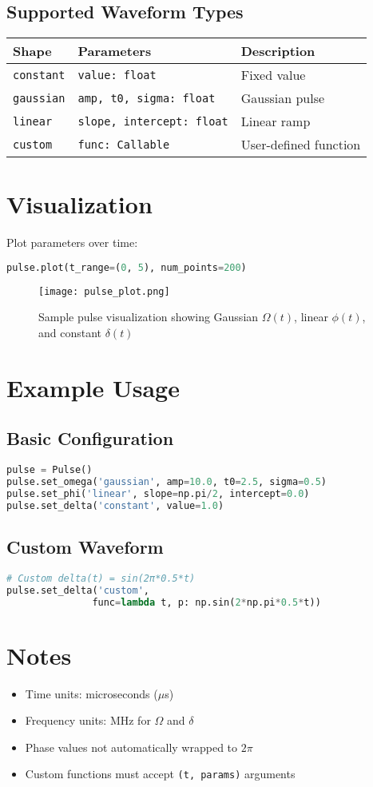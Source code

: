 \documentclass{article}
\begin{document}
\subsection{Supported Waveform Types}
\begin{tabular}{@{}lll@{}}
    \toprule
    \textbf{Shape} & \textbf{Parameters} & \textbf{Description} \\
    \midrule
    \texttt{constant} & \texttt{value: float} & Fixed value \\
    \texttt{gaussian} & \texttt{amp, t0, sigma: float} & Gaussian pulse \\
    \texttt{linear} & \texttt{slope, intercept: float} & Linear ramp \\
    \texttt{custom} & \texttt{func: Callable} & User-defined function \\
    \bottomrule
\end{tabular}

\section{Visualization}
Plot parameters over time:
\begin{lstlisting}[language=Python]
pulse.plot(t_range=(0, 5), num_points=200)
\end{lstlisting}

\begin{figure}[h]
    \centering
    \texttt{[image: pulse\_plot.png]}
    \caption{Sample pulse visualization showing Gaussian \(\Omega(t)\), linear \(\phi(t)\), and constant \(\delta(t)\)}
\end{figure}

\section{Example Usage}
\subsection{Basic Configuration}
\begin{lstlisting}[language=Python]
pulse = Pulse()
pulse.set_omega('gaussian', amp=10.0, t0=2.5, sigma=0.5)
pulse.set_phi('linear', slope=np.pi/2, intercept=0.0)
pulse.set_delta('constant', value=1.0)
\end{lstlisting}

\subsection{Custom Waveform}
\begin{lstlisting}[language=Python]
# Custom delta(t) = sin(2π*0.5*t)
pulse.set_delta('custom', 
               func=lambda t, p: np.sin(2*np.pi*0.5*t))
\end{lstlisting}

\section*{Notes}
\begin{itemize}
    \item Time units: microseconds (\(\mu\)s)
    \item Frequency units: MHz for \(\Omega\) and \(\delta\)
    \item Phase values not automatically wrapped to \(2\pi\)
    \item Custom functions must accept \texttt{(t, params)} arguments
\end{itemize}
\end{document}
